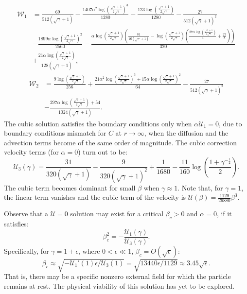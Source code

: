 \documentclass[MSc,beforeExam]{iitcsthesis}
\newcommand\eps \epsilon
\newcommand{\pars}[1]{\left(#1\right)}
\newcommand\cU{\mathscr{U}}
\newcommand\cW{\mathscr{W}}
\begin{document}
\begin{align*}
\cW_1 &= \frac{69}{512 \left(\sqrt{\gamma} + 1\right)} - \frac{1407\alpha^2 {\log\left(\frac{\sqrt{\gamma} + 1}{2 \sqrt{\gamma}}\right)}^3}{1280} - \frac{123 \log\left(\frac{\sqrt{\gamma} + 1}{2 \sqrt{\gamma}}\right)}{1280} - \frac{27}{512 {\left(\sqrt{\gamma} + 1\right)}^2} 
\\ & -\frac{1899\alpha {\log\left(\frac{\sqrt{\gamma} + 1}{2 \sqrt{\gamma}}\right)}^2}{2560} 
- \frac{\alpha \log\left(\frac{\sqrt{\gamma} + 1}{2 \sqrt{\gamma}}\right) \left(\frac{81}{16 \left(\sqrt{\gamma} + 1\right)} - \log\left(\frac{\sqrt{\gamma} + 1}{2 \sqrt{\gamma}}\right) \left(\frac{27\alpha \log\left(\frac{\sqrt{\gamma} + 1}{2 \sqrt{\gamma}}\right)}{4} + \frac{27}{8}\right)\right)}{320} 
\\ & + \frac{21\alpha \log\left(\frac{\sqrt{\gamma} + 1}{2 \sqrt{\gamma}}\right)}{128 \left(\sqrt{\gamma} + 1\right)},
\end{align*}
\begin{align*}
\cW_2 &= \frac{9 \log\left(\frac{\sqrt{\gamma} + 1}{2 \sqrt{\gamma}}\right)}{256} 
+ \frac{21\alpha^2 {\log\left(\frac{\sqrt{\gamma} + 1}{2 \sqrt{\gamma}}\right)}^3 + 
15\alpha {\log\left(\frac{\sqrt{\gamma} + 1}{2 \sqrt{\gamma}}\right)}^2}{64} 
- \frac{27}{512 {\left(\sqrt{\gamma} + 1\right)}^2}
\\ \nonumber &
- \frac{297\alpha \log\left(\frac{\sqrt{\gamma} + 1}{2 \sqrt{\gamma}}\right) + 54}{1024 \left(\sqrt{\gamma} + 1\right)}.
\end{align*}
The cubic solution satisfies the boundary conditions only when $\alpha\cU_1 = 0$,
due to boundary conditions mismatch for $C$ at $r \rightarrow \infty$, when
the diffusion and the advection terms become of the same order of magnitude.
The cubic correction velocity terms (for $\alpha = 0$)
turn out to be:
\begin{equation}
\cU_3(\gamma) = \frac{31}{320(\sqrt\gamma + 1)} - \frac{9}{320(\sqrt\gamma + 1)^2} + \frac{1}{1680} - \frac{11}{160} \log \pars{\frac{1 + \gamma^{-\frac{1}{2}}}{2}}.
\end{equation}
The cubic term becomes dominant for small $\beta$ when $\gamma \approx 1$.
Note that, for $\gamma = 1$, the linear term vanishes and the cubic term 
of the velocity is $\cU(\beta) = \frac{1129}{26880}\beta^3$.

Observe that a $\cU = 0$ solution may exist for a critical $\beta_c > 0$ and $\alpha = 0$, 
if it satisfies:
\begin{equation} \label{eq:crit_beta}
\beta_c^2 = -\frac{\cU_1(\gamma)}{\cU_3(\gamma)}.
\end{equation}
Specifically, for $\gamma = 1 + \eps$, where $0 < \eps \ll 1$, $\beta_c = O\pars{\sqrt{\eps}}$:
\begin{equation}
\beta_c \approx \sqrt{-{\cU_1'(1) \eps}/{\cU_3(1)}} = 
 \sqrt{{13440 \eps}/{1129}} \approx 3.45 \sqrt{\eps}.
\end{equation}
That is, there may be a specific nonzero external field for which the particle remains at rest. The physical viability of this solution has yet to be explored.
\end{document}
